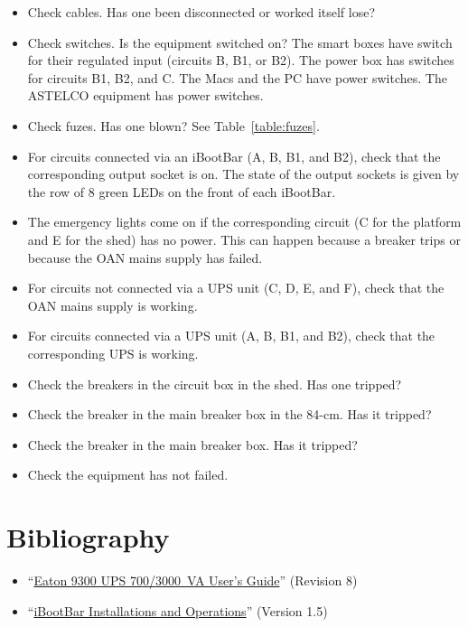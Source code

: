 \begin{itemize}
\item Check cables. Has one been disconnected or worked itself lose?
\item Check switches. Is the equipment switched on? The smart boxes have switch for their regulated input (circuits B, B1, or B2). The power box has switches for circuits B1, B2, and C. The Macs and the PC have power switches. The ASTELCO equipment has power switches.
\item Check fuzes. Has one blown? See Table~\ref{table:fuzes}.
\item For circuits connected via an iBootBar (A, B, B1, and B2), check that the corresponding output socket is on. The state of the output sockets is given by the row of 8 green LEDs on the front of each iBootBar.
\item The emergency lights come on if the corresponding circuit (C for the platform and E for the shed) has no power. This can happen because a breaker trips or because the OAN mains supply has failed.
\item For circuits not connected via a UPS unit (C, D, E, and F), check that the OAN mains supply is working.
\item For circuits connected via a UPS unit (A, B, B1, and B2), check that the corresponding UPS is working.
\item Check the breakers in the circuit box in the shed. Has one tripped?
\ifcoatli
\item Check the breaker in the main breaker box in the 84-cm. Has it tripped?
\fi
\ifddoti
\item Check the breaker in the main breaker box. Has it tripped?
\fi
\item Check the equipment has not failed.
\end{itemize}

\section{Bibliography}

\begin{flushleft}
\begin{itemize}
\item “\href{bibliography/eaton-9130-ups.pdf}{Eaton 9300 UPS 700/3000~VA User's Guide}” (Revision 8)
\item “\href{bibliography/dataprobe-ibootbar.pdf}{iBootBar Installations and Operations}” (Version 1.5)
\end{itemize}
\end{flushleft}

